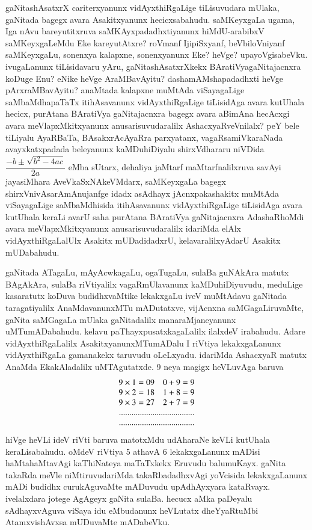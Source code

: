 gaNitashAsatxrX cariterxyanunx vidAyxthiRgaLige tiLisuvudara mUlaka, gaNitada bagegx avara Asakitxyanunx hecicxsabahudu. saMKeyxgaLa ugama, Iga nAvu bareyutitxruva saMKAyx\-padadhxtiyanunx hiMdU-arabibxV saMKeyxgaLeMdu Eke kareyutAtxre? roVmanf IjipiSx\-yanf, beVbiloVniyanf saMKeyxgaLu, sonenxya kalapxne, sonenxyanunx Eke? heVge? upayoVgisabeVku. ivugaLanunx tiLisidavaru yAru, gaNitashAsatxrXkekx BAratiVya\break gaNitajacnxra koDuge Enu? eNike heVge AraMBavAyitu? dashamAMshapadadhxti heVge pArxraMBavAyitu? anaMtada kalapxne muMtAda viSayagaLige saMbaMdhapaTaTx itihAsa\-vanunx vidAyxthiR\-gaLige tiLisidAga avara kutUhala hecicx, purAtana BAratiVya \-gaNitajacnxra bagegx avara aBimAna hecAcxgi avara meVlapxMkitxyanunx anusarisuvudaralilx AshacxyaR\-veVnilalx? peY bele tiLiyalu AyaRBaTa, BAsakxrAcAyaRra parxyatanx, vagaRsamiVka\-raNada avayxkatxpadada beleyanunx kaMDuhiDiyalu shirxVdhararu niVDida $\dfrac{-b \pm \sqrt{b^2-4ac}}{2a}$ eMba sUtarx, dehaliya jaMtarf maMtarfnalilxruva savAyi jayasiMhara AveVkaSxNA\-keVMdarx, saMKeyxgaLa bagegx shirxVnivAsarAmAnujanfge idadx asAdhayx jAcnxpakashakitx muMtAda viSayagaLige saMbaMdhisida itihAsavanunx vidAyxthiRgaLige tiLisidAga avara kutUhala keraLi avarU saha purAtana BAratiVya gaNitajacnxra AdashaRhoMdi avara meVlapxMkitx\-yanunx anusarisuvudaralilx idariMda elAlx vidAyxthiRgaLalUlx Asakitx mUDadidadxrU, kelavaralilxyAdarU Asakitx mUDabahudu.

gaNitada ATagaLu, mAyAcwkagaLu, ogaTugaLu, sulaBa guNAkAra matutx BAgAkAra, sulaBa riVtiyalilx vagaRmUlavanunx kaMDuhiDiyuvudu, meduLige kasaratutx koDuva budidhxvaMtike lekakxgaLu iveV muMtAdavu gaNitada taragatiyalilx AnaMdavanunxMTu mADutatxve, vijAcnxna saMGagaLiruvaMte, gaNita saMGagaLa mUlaka gaNitadalilx manaraMjaneyanunx uMTumADabahudu. kelavu paThayxpusatxkagaLalilx ilalxdeV irabahudu. Adare vidAyxthiRgaLalilx AsakitxyanunxMTumADalu I riVtiya lekakxgaLanunx vidAyxthiRgaLa gamanakekx taruvudu oLeLxyadu. idariMda AshacxyaR matutx AnaMda EkakAladalilx uMTAgutatxde. {\rm 9} neya magigx heVLuvAga baruva 
$$
\begin{array}{cc}
9\times 1=09 & 0+9 = 9\\
9\times 2=18 & 1+8 = 9\\
9\times 3=27 & 2+7 = 9\\
\multicolumn{2}{c}{....................................}\\
\multicolumn{2}{c}{....................................}
\end{array}
$$ hiVge heVLi ideV riVti baruva matotxMdu udAharaNe keVLi kutUhala keraLisabahudu. oMdeV riVtiya {\rm 5} athavA {\rm 6} lekakxgaLanunx mADisi haMtahaMtavAgi kaThiNateya maTaTxkekx Eruvudu balumuKayx. gaNita takaRda meVle niMtiruvudariMda takaRbadadhxvAgi yoVcisida lekakxgaLanunx mADi budidhx curukAguvaMte mADuvudu upAdhAyxyara kataRvayx. ivelalxdara jotege AgAgeyx gaNita sulaBa. hecucx aMka paDeyalu sAdhayxvAguva viSaya idu eMbudanunx heVLutatx dheYyaRtuMbi AtamxvishAvxsa mUDuvaMte mADabeVku.

